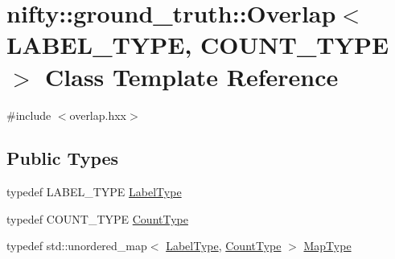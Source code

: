 \hypertarget{classnifty_1_1ground__truth_1_1Overlap}{}\section{nifty\+:\+:ground\+\_\+truth\+:\+:Overlap$<$ L\+A\+B\+E\+L\+\_\+\+T\+Y\+PE, C\+O\+U\+N\+T\+\_\+\+T\+Y\+PE $>$ Class Template Reference}
\label{classnifty_1_1ground__truth_1_1Overlap}


{\ttfamily \#include $<$overlap.\+hxx$>$}

\subsection*{Public Types}
\begin{DoxyCompactItemize}
\item 
typedef L\+A\+B\+E\+L\+\_\+\+T\+Y\+PE \hyperlink{classnifty_1_1ground__truth_1_1Overlap_af14b9a872d3736d3115231866bc71612}{Label\+Type}
\item 
typedef C\+O\+U\+N\+T\+\_\+\+T\+Y\+PE \hyperlink{classnifty_1_1ground__truth_1_1Overlap_ab8f82b8fef890dc3d7b69da0cc768c76}{Count\+Type}
\item 
typedef std\+::unordered\+\_\+map$<$ \hyperlink{classnifty_1_1ground__truth_1_1Overlap_af14b9a872d3736d3115231866bc71612}{Label\+Type}, \hyperlink{classnifty_1_1ground__truth_1_1Overlap_ab8f82b8fef890dc3d7b69da0cc768c76}{Count\+Type} $>$ \hyperlink{classnifty_1_1ground__truth_1_1Overlap_a6866ee8c988dd21d3fbd6ee5c2e836bf}{Map\+Type}
\end{DoxyCompactItemize}
